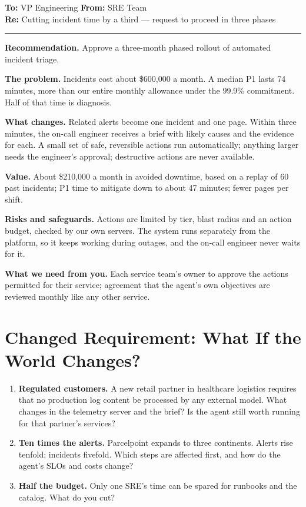 \begin{tcolorbox}[colback=white, colframe=black!60, boxrule=0.6pt, arc=1pt, left=10pt, right=10pt, top=8pt, bottom=8pt, fontupper=\small]
\textbf{To:} VP Engineering \hfill \textbf{From:} SRE Team\\
\textbf{Re:} Cutting incident time by a third --- request to proceed in three phases

\smallskip\hrule\smallskip

\textbf{Recommendation.} Approve a three-month phased rollout of automated incident triage.

\textbf{The problem.} Incidents cost about \$600{,}000 a month. A median P1 lasts 74 minutes, more than our entire monthly allowance under the 99.9\% commitment. Half of that time is diagnosis.

\textbf{What changes.} Related alerts become one incident and one page. Within three minutes, the on-call engineer receives a brief with likely causes and the evidence for each. A small set of safe, reversible actions run automatically; anything larger needs the engineer's approval; destructive actions are never available.

\textbf{Value.} About \$210{,}000 a month in avoided downtime, based on a replay of 60 past incidents; P1 time to mitigate down to about 47 minutes; fewer pages per shift.

\textbf{Risks and safeguards.} Actions are limited by tier, blast radius and an action budget, checked by our own servers. The system runs separately from the platform, so it keeps working during outages, and the on-call engineer never waits for it.

\textbf{What we need from you.} Each service team's owner to approve the actions permitted for their service; agreement that the agent's own objectives are reviewed monthly like any other service.
\end{tcolorbox}

\section{Changed Requirement: What If the World Changes?}
\label{sec:inc-changed}

\begin{enumerate}[itemsep=3pt]
  \item \textbf{Regulated customers.} A new retail partner in healthcare logistics requires that no production log content be processed by any external model. What changes in the telemetry server and the brief? Is the agent still worth running for that partner's services?
  \item \textbf{Ten times the alerts.} Parcelpoint expands to three continents. Alerts rise tenfold; incidents fivefold. Which steps are affected first, and how do the agent's SLOs and costs change?
  \item \textbf{Half the budget.} Only one SRE's time can be spared for runbooks and the catalog. What do you cut?
\end{enumerate}

